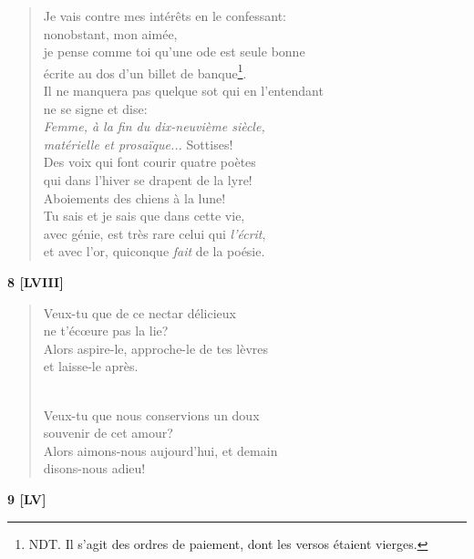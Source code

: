 \documentclass[a4paper,11pt]{book}
\begin{document}
\begin{verse}
Je vais contre mes intérêts en le confessant: \\
nonobstant, mon aimée, \\
je pense comme toi qu'une ode est seule bonne \\
écrite au dos d'un billet de banque\footnote{NDT. Il s'agit des ordres de paiement, dont les versos étaient vierges.}. \\
Il ne manquera pas quelque sot qui en l'entendant \\
ne se signe et dise: \\
{\em Femme, à la fin du dix-neuvième siècle, \\
matérielle et prosaïque...} Sottises! \\
Des voix qui font courir quatre poètes \\
qui dans l'hiver se drapent de la lyre! \\
Aboiements des chiens à la lune! \\
Tu sais et je sais que dans cette vie, \\
avec génie, est très rare celui qui {\em l'écrit}, \\
et avec l'or, quiconque {\em fait} de la poésie. \\
\end{verse}

\bigskip

\begin{center} {\bf 8 [LVIII]} \end{center}

\begin{verse}
Veux-tu que de ce nectar délicieux \\
ne t'éc{\oe}ure pas la lie? \\
Alors aspire-le, approche-le de tes lèvres \\
et laisse-le après. \\ \

Veux-tu que nous conservions un doux \\
souvenir de cet amour? \\
Alors aimons-nous aujourd'hui, et demain \\
disons-nous adieu! \\
\end{verse}

\bigskip

\begin{center} {\bf 9 [LV]} \end{center}
\end{document}
